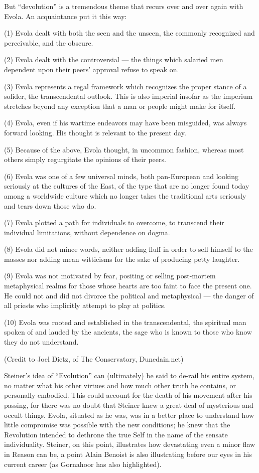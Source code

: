 But ``devolution'' is a tremendous theme that recurs over and over again with Evola. An acquaintance put it this way:

\begin{quotex}
(1) Evola dealt with both the seen and the unseen, the commonly recognized and perceivable, and the obscure.

(2) Evola dealt with the controversial --- the things which salaried men dependent upon their peers' approval refuse to speak on.

(3) Evola represents a regal framework which recognizes the proper stance of a solider, the transcendental outlook. This is also imperial insofar as the imperium stretches beyond any exception that a man or people might make for itself.

(4) Evola, even if his wartime endeavors may have been misguided, was always forward looking. His thought is relevant to the present day.

(5) Because of the above, Evola thought, in uncommon fashion, whereas most others simply regurgitate the opinions of their peers.

(6) Evola was one of a few universal minds, both pan-European and looking seriously at the cultures of the East, of the type that are no longer found today among a worldwide culture which no longer takes the traditional arts seriously and tears down those who do.

(7) Evola plotted a path for individuals to overcome, to transcend their individual limitations, without dependence on dogma.

(8) Evola did not mince words, neither adding fluff in order to sell himself to the masses nor adding mean witticisms for the sake of producing petty laughter.

(9) Evola was not motivated by fear, positing or selling post-mortem metaphysical realms for those whose hearts are too faint to face the present one. He could not and did not divorce the political and metaphysical --- the danger of all priests who implicitly attempt to play at politics.

(10) Evola was rooted and established in the transcendental, the spiritual man spoken of and lauded by the ancients, the sage who is known to those who know they do not understand.
\end{quotex}


(Credit to Joel Dietz, of The Conservatory, Dunedain.net)

Steiner's idea of ``Evolution'' can (ultimately) be said to de-rail his entire system, no matter what his other virtues and how much other truth he contains, or personally embodied. This could account for the death of his movement after his passing, for there was no doubt that Steiner knew a great deal of mysterious and occult things. Evola, situated as he was, was in a better place to understand how little compromise was possible with the new conditions; he knew that the Revolution intended to dethrone the true Self in the name of the sensate individuality. Steiner, on this point, illustrates how devastating even a minor flaw in Reason can be, a point Alain Benoist is also illustrating before our eyes in his current career (as Gornahoor has also highlighted).

